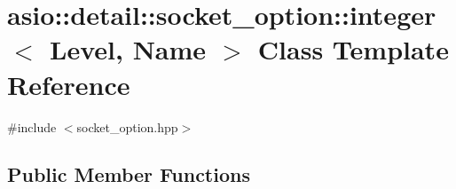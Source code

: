 \hypertarget{classasio_1_1detail_1_1socket__option_1_1integer}{}\section{asio\+:\+:detail\+:\+:socket\+\_\+option\+:\+:integer$<$ Level, Name $>$ Class Template Reference}
\label{classasio_1_1detail_1_1socket__option_1_1integer}


{\ttfamily \#include $<$socket\+\_\+option.\+hpp$>$}

\subsection*{Public Member Functions}

